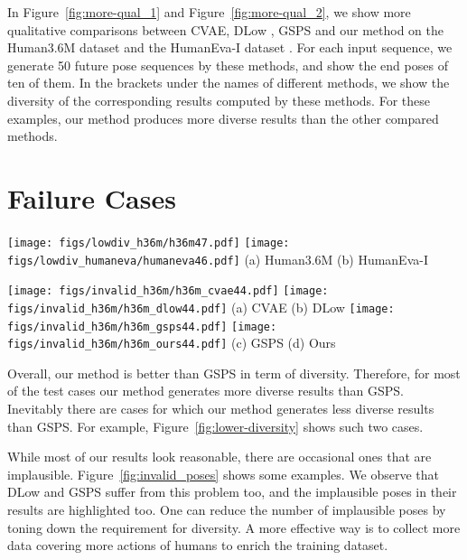 \documentclass[sigconf,screen,nonacm]{acmart}
\begin{document}
	
	In Figure~\ref{fig:more-qual_1} and Figure~\ref{fig:more-qual_2}, we show more qualitative comparisons between CVAE, DLow \cite{yuan2020dlow}, GSPS \cite{mao2021generating} and our method on the Human3.6M dataset \cite{ionescu2013human3} and the HumanEva-I dataset \cite{sigal2010humaneva}. For each input sequence, we generate 50 future pose sequences by these methods, and show the end poses of ten of them. In the brackets under the names of different methods, we show the diversity of the corresponding results computed by these methods. For these examples, our method produces more diverse results than the other compared methods.
	
	


	\section{Failure Cases}
	
\begin{figure*}[!t]
		\centering
		\texttt{[image: figs/lowdiv\_h36m/h36m47.pdf]} 
		\texttt{[image: figs/lowdiv\_humaneva/humaneva46.pdf]}
		\flushleft \hspace{4cm} (a) Human3.6M \hspace{6.5cm} (b) HumanEva-I 
		\caption{Two examples for which our method generates lower diverse results than GSPS.}
		\label{fig:lower-diversity}
	\end{figure*}
	
\begin{figure*}[!t]
		\centering
		\texttt{[image: figs/invalid\_h36m/h36m\_cvae44.pdf]} 
		\texttt{[image: figs/invalid\_h36m/h36m\_dlow44.pdf]} 
		\flushleft \hspace{4.5cm} (a) CVAE \hspace{7.8cm} (b) DLow 
		\texttt{[image: figs/invalid\_h36m/h36m\_gsps44.pdf]} 
		\texttt{[image: figs/invalid\_h36m/h36m\_ours44.pdf]} 
		\flushleft \hspace{4.5cm} (c) GSPS \hspace{7.8cm} (d) Ours 
		\caption{Examples of implausible poses in the results of DLow, GSPS, and our method.}
		\label{fig:invalid_poses}
	\end{figure*}
	
	Overall, our method is better than GSPS in term of diversity. Therefore, for most of the test cases our method generates more diverse results than GSPS. Inevitably there are cases for which our method generates less diverse results than GSPS. For example, Figure~\ref{fig:lower-diversity} shows such two cases. 
	
	While most of our results look reasonable, there are occasional ones that are implausible. Figure~\ref{fig:invalid_poses} shows some examples. We observe that DLow and GSPS suffer from this problem too, and the implausible poses in their results are highlighted too. One can reduce the number of implausible poses by toning down the requirement for diversity. A more effective way is to collect more data covering more actions of humans to enrich the training dataset.
	
	
\end{document}
